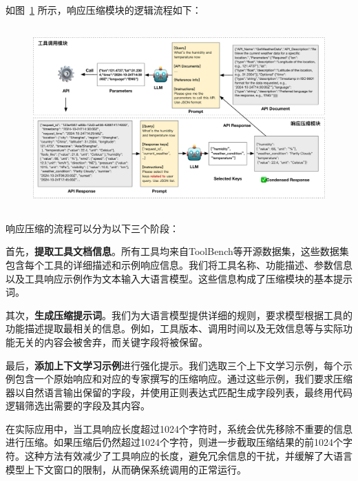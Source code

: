 如图~\ref{fig:ch4-compression} 所示，响应压缩模块的逻辑流程如下：

\begin{figure}[!htp]
  \vspace{1em}
  \centering
  \setlength{\abovecaptionskip}{10pt} %
  \includegraphics[height=7cm]{../assets/ch4-工具调用模块.pdf}
  \label{fig:ch4-compression}
\end{figure}

响应压缩的流程可以分为以下三个阶段：

首先，\textbf{提取工具文档信息}。所有工具均来自ToolBench等开源数据集，这些数据集包含每个工具的详细描述和示例响应信息。我们将工具名称、功能描述、参数信息以及工具响应示例作为文本输入大语言模型。这些信息构成了压缩模块的基本提示词。

其次，\textbf{生成压缩提示词}。我们为大语言模型提供详细的规则，要求模型根据工具的功能描述提取最相关的信息。例如，工具版本、调用时间以及无效信息等与实际功能无关的内容会被舍弃，而关键字段将被保留。

最后，\textbf{添加上下文学习示例}进行强化提示。我们选取三个上下文学习示例，每个示例包含一个原始响应和对应的专家撰写的压缩响应。通过这些示例，我们要求压缩器以自然语言输出保留的字段，并使用正则表达式匹配生成字段列表，最终用代码逻辑筛选出需要的字段及其内容。

在实际应用中，当工具响应长度超过1024个字符时，系统会优先移除不重要的信息进行压缩。如果压缩后仍然超过1024个字符，则进一步截取压缩结果的前1024个字符。这种方法有效减少了工具响应的长度，避免冗余信息的干扰，并缓解了大语言模型上下文窗口的限制，从而确保系统调用的正常运行。


